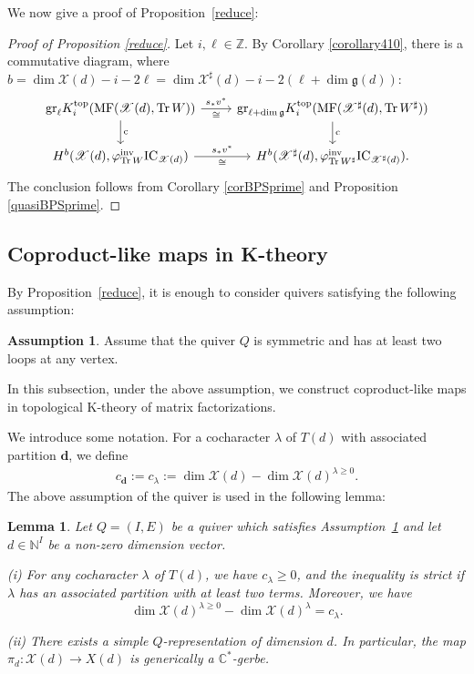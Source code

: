 \documentclass [11pt,oneside,a4paper,mathscr]{amsart}
\newtheorem{lemma}[thm]{Lemma}
\theoremstyle{definition}
\newtheorem{assum}{Assumption}[section]
\renewcommand{\geq}{\geqslant}
\newcommand{\X}{\mathscr{X}}
\begin{document}
We now give a proof of Proposition~\ref{reduce}: 
\begin{proof}[Proof of Proposition \ref{reduce}]
   Let $i,\ell\in\mathbb{Z}$.
   By Corollary \ref{corollary410}, there is a commutative diagram, where $b=\dim \X(d)-i-2\ell=\dim \X^\sharp(d)-i-2(\ell+\dim \mathfrak{g}(d))$:
   \begin{equation*}
       \begin{tikzcd}
           \mathrm{gr}_\ell K^{\mathrm{top}}_i(\mathrm{MF}(\X(d), \mathrm{Tr}\,W))
           \arrow[r, "\cong"', "s_*v^*"]
           \arrow[d, "\mathrm{c}"]& \mathrm{gr}_{\ell+\dim \mathfrak{g}} K^{\mathrm{top}}_i(\mathrm{MF}(\X^\sharp(d), \mathrm{Tr}\,W^\sharp))
           \arrow[d, "\mathrm{c}"]\\
           H^b(\X(d), \varphi_{\mathrm{Tr}\,W}^{\mathrm{inv}}\mathrm{IC}_{\X(d)})\arrow[r, "\cong"', "s_*v^*"]& H^{b}(\X^\sharp(d), \varphi_{\mathrm{Tr}\,W^\sharp}^{\mathrm{inv}}\mathrm{IC}_{\X^{\sharp}(d)}).
       \end{tikzcd}
       \end{equation*}
       The conclusion follows from Corollary \ref{corBPSprime} and Proposition \ref{quasiBPSprime}.
\end{proof}

    




\subsection{Coproduct-like maps in K-theory}\label{subsec64}
By Proposition~\ref{reduce}, it is enough to consider quivers 
satisfying the following assumption: 

\begin{assum}\label{assum3}
    Assume that the quiver $Q$ is symmetric and has at least two loops at any vertex.  
\end{assum}

In this subsection, under the above assumption, 
we construct coproduct-like maps in topological K-theory 
of matrix factorizations. 

We introduce some notation. For a cocharacter $\lambda$ of $T(d)$ 
with associated partition $\mathbf{d}$, we define 
\begin{align}\label{def:cd}
c_{\mathbf{d}}:=c_\lambda:=\dim \X(d)-\dim \X(d)^{\lambda\geq 0}.
\end{align}
The above assumption of the quiver is used in the following lemma: 

\begin{lemma}\label{clambdazero}
    Let $Q=(I,E)$ be a quiver which satisfies Assumption~\ref{assum3} and let $d\in\mathbb{N}^I$ be a non-zero dimension vector.

    (i) For any cocharacter $\lambda$ of $T(d)$, we have $c_\lambda\geq 0$, and the inequality is strict if $\lambda$ has an associated partition with at least two terms. Moreover, we have \[\dim \X(d)^{\lambda\geq 0}-\dim \X(d)^\lambda=c_\lambda.\]

    (ii) There exists a simple $Q$-representation of dimension $d$.
    In particular, the map $\pi_d\colon \X(d)\to X(d)$ is generically a $\mathbb{C}^*$-gerbe.  
\end{lemma}
\end{document}
